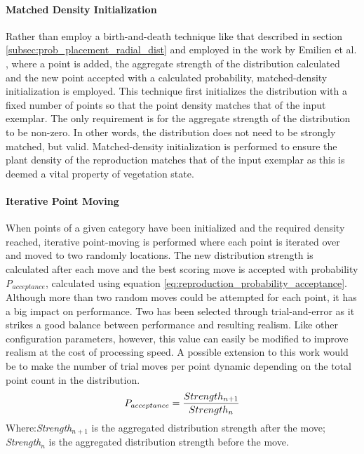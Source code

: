 \paragraph{Matched Density Initialization}

Rather than employ a birth-and-death technique like that described in section \ref{subsec:prob_placement_radial_dist} and employed in the work by Emilien et al. \cite{Emilien}, where a point is added, the aggregate strength of the distribution calculated and the new point accepted with a calculated probability, matched-density initialization is employed. This technique first initializes the distribution with a fixed number of points so that the point density matches that of the input exemplar. The only requirement is for the aggregate strength of the distribution to be non-zero. In other words, the distribution does not need to be strongly matched, but valid. Matched-density initialization is performed to ensure the plant density of the reproduction matches that of the input exemplar as this is deemed a vital property of vegetation state.\\

\paragraph{Iterative Point Moving} 

When points of a given category have been initialized and the required density reached, iterative point-moving is performed where each point is iterated over and moved to two randomly locations. The new distribution strength is calculated after each move and the best scoring move is accepted with probability \textit{P$_{acceptance}$}, calculated using equation \ref{eq:reproduction_probability_acceptance}. Although more than two random moves could be attempted for each point, it has a big impact on performance. Two has been selected through trial-and-error as it strikes a good balance between performance and resulting realism. Like other configuration parameters, however, this value can easily be modified to improve realism at the cost of processing speed. A possible extension to this work would be to make the number of trial moves per point dynamic depending on the total point count in the distribution. \\

\begin{equation}
\centering
P_{acceptance} = \frac{Strength_{n+1}}{Strength_{n}}
\label{eq:reproduction_probability_acceptance}
\end{equation}
Where:\textit{Strength$_{n+1}$} is the aggregated distribution strength after the move; \textit{Strength$_{n}$} is the aggregated distribution strength before the move.

